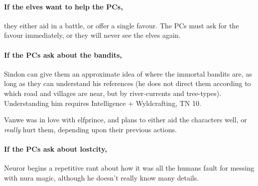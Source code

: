 \paragraph{If the elves want to help the PCs,}
they either aid in a battle, or offer a single favour.
The PCs must ask for the favour immediately, or they will never see the elves again.


\paragraph{If the PCs ask about the bandits,}
Sindon can give them an approximate idea of where the immortal bandits are, as long as they can understand his references (he does not direct them according to which road and villages are near, but by river-currents and tree-types).
Understanding him requires Intelligence + Wyldcrafting, TN 10.


Vanwe was in love with \gls{elfprince}, and plans to either aid the characters well, or \emph{really} hurt them, depending upon their previous actions.

\label{neuror}

\paragraph{If the PCs ask about \gls{lostcity},}
Neuror begins a repetitive rant about how it was all the humans fault for messing with nura magic, although he doesn't really know many details.

\stopcontents[sq]


